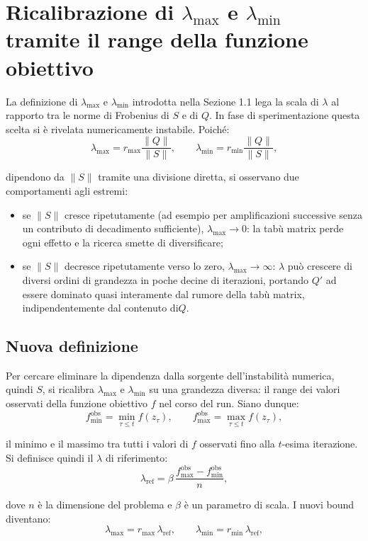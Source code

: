 \documentclass[12pt, letterpaper]{article}
\begin{document}
\section{Ricalibrazione di $\lambda_{\max}$ e $\lambda_{\min}$ tramite il range della funzione obiettivo}
La definizione di $\lambda_{\max}$ e $\lambda_{\min}$ introdotta nella Sezione 1.1 lega la scala di \(\lambda\)
al rapporto tra le norme di Frobenius di \(S\) e di \(Q\). In fase di sperimentazione questa scelta si è
rivelata numericamente instabile. Poiché:
\[
\lambda_{\max} = r_{\max} \frac{\|Q\|}{\|S\|},
\qquad
\lambda_{\min} = r_{\min} \frac{\|Q\|}{\|S\|},
\]

dipendono da $\|S\|$ tramite una divisione diretta, si osservano due comportamenti agli estremi:
\begin{itemize}
    \item se $\|S\|$ cresce ripetutamente (ad esempio per amplificazioni successive senza un contributo
    di decadimento sufficiente), \(\lambda_{\max} \to 0\): la tabù matrix perde ogni effetto e la ricerca
    smette di diversificare;
    \item se $\|S\|$ decresce ripetutamente verso lo zero, \(\lambda_{\max} \to \infty\): \(\lambda\) può
    crescere di diversi ordini di grandezza in poche decine di iterazioni, portando \(Q'\) ad essere
    dominato quasi interamente dal rumore della tabù matrix, indipendentemente dal contenuto di\(Q\).
\end{itemize}

\subsection{Nuova definizione}
Per cercare eliminare la dipendenza dalla sorgente dell'instabilità numerica, quindi \(S\), si 
ricalibra \(\lambda_{\max}\) e \(\lambda_{\min}\) su una grandezza diversa: il range dei valori osservati
della funzione obiettivo \(f\) nel corso del run. Siano dunque:
\[
f_{\min}^{\text{obs}} = \min_{\tau \le t} f(z_\tau),
\qquad
f_{\max}^{\text{obs}} = \max_{\tau \le t} f(z_\tau),
\]

il minimo e il massimo tra tutti i valori di \(f\) osservati fino alla \(t\)-esima iterazione. 
Si definisce quindi il \(\lambda\) di riferimento:
\begin{equation}
\lambda_{\text{ref}} = \beta \, \frac{f_{\max}^{\text{obs}} - f_{\min}^{\text{obs}}}{n},
\label{eq:lambda_ref}
\end{equation}

dove \(n\) è la dimensione del problema e \(\beta\) è un parametro di scala. I nuovi bound
diventano:
\begin{equation}
\lambda_{\max} = r_{\max} \, \lambda_{\text{ref}},
\qquad
\lambda_{\min} = r_{\min} \, \lambda_{\text{ref}},
\label{eq:lambda_bounds_frange}
\end{equation}
\end{document}
